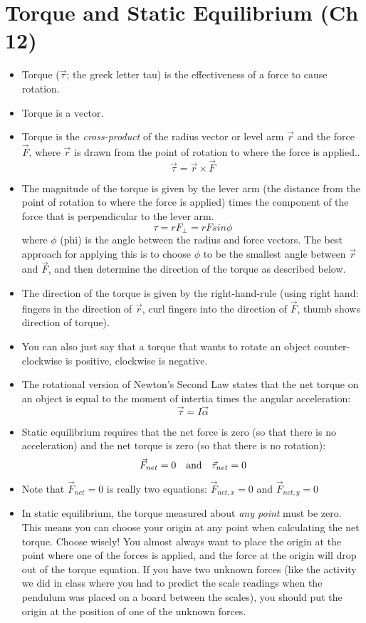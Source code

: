 \section{Torque and Static Equilibrium (Ch 12)} 
\vspace*{-.15in}
\begin{itemize}
\item Torque ($\vec{\tau}$; the greek letter tau) is the effectiveness of a force to cause rotation.
\item Torque is a vector.  
\item Torque is the {\em cross-product} of the radius vector or level
  arm $\vec{r}$ and the force $\vec{F}$, where $\vec{r}$ is drawn from
  the point of rotation to where the force is applied..  
$$ \vec{\tau} = \vec{r} \times \vec{F}$$
\item The magnitude of the torque is given by the lever arm (the distance from the point of rotation to where the force is applied) times the component of the force that is perpendicular to the lever arm.
$$ \tau = r F_{\perp} = r F sin \phi $$ where $\phi$ (phi) is the angle between the radius and force vectors.  The best approach for applying this is to choose $\phi$ to be the smallest angle between $\vec{r}$ and $\vec{F}$, and then determine the direction of the torque as described below.
\item The direction of the torque is given by the right-hand-rule (using right hand: fingers in the direction of $\vec{r}$, curl fingers into the direction of $\vec{F}$, thumb shows direction of torque).
\item You can also just say that a torque that wants to rotate an object counter-clockwise is positive, clockwise is negative.
\item The rotational version of Newton's Second Law states that the net torque on an object is equal to the moment of intertia times the angular acceleration:
$$ \vec{\tau} = I \vec{\alpha}$$
\item Static equilibrium requires that the net force is zero (so that
  there is no
  acceleration) and the net torque is zero (so that there is no rotation):
$$ \vec{F}_{net} = 0 ~~~ {\rm and} ~~~ \vec{\tau}_{net} = 0$$
\item Note that $\vec{F}_{net} = 0$ is really two equations: $\vec{F}_{net,x} = 0$ and $\vec{F}_{net,y} = 0$ 
\item In static equilibrium, the torque measured about {\em any point}
  must be zero.  This means you can choose your origin at any point
  when calculating the net torque.  Choose wisely!  You almost always
  want to place the origin at the point where one of the forces is
  applied, and the force at the origin will drop out of the torque
  equation.  If you have two unknown forces (like the activity we did
  in class where you had to predict the scale readings when the
  pendulum was placed on a board between the scales), you should put the origin at the position of one of the
  unknown forces.
\end{itemize}


